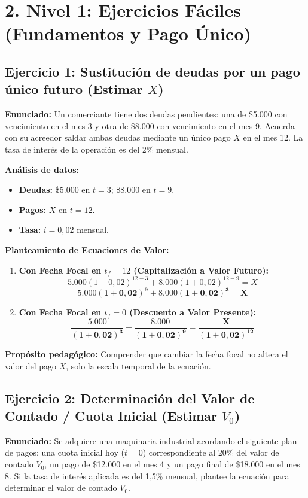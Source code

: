 \documentclass[11pt, a4paper]{article}
\begin{document}
\section*{\color{primary} 2. Nivel 1: Ejercicios Fáciles (Fundamentos y Pago Único)}

\subsection*{\color{secondary} Ejercicio 1: Sustitución de deudas por un pago único futuro (Estimar $X$)}
\textbf{Enunciado:} Un comerciante tiene dos deudas pendientes: una de \$5.000 con vencimiento en el mes 3 y otra de \$8.000 con vencimiento en el mes 9. Acuerda con su acreedor saldar ambas deudas mediante un único pago $X$ en el mes 12. La tasa de interés de la operación es del 2\% mensual.

\textbf{Análisis de datos:}
\begin{itemize}
    \item \textbf{Deudas:} \$5.000 en $t=3$; \$8.000 en $t=9$.
    \item \textbf{Pagos:} $X$ en $t=12$.
    \item \textbf{Tasa:} $i = 0,02$ mensual.
\end{itemize}

\textbf{Planteamiento de Ecuaciones de Valor:}
\begin{enumerate}[label=\alph*)]
    \item \textbf{Con Fecha Focal en $t_f = 12$ (Capitalización a Valor Futuro):}
    \[
    5.000(1 + 0,02)^{12-3} + 8.000(1 + 0,02)^{12-9} = X
    \]
    \[
    \mathbf{5.000(1 + 0,02)^9 + 8.000(1 + 0,02)^3 = X}
    \]

    \item \textbf{Con Fecha Focal en $t_f = 0$ (Descuento a Valor Presente):}
    \[
    \mathbf{\frac{5.000}{(1 + 0,02)^3} + \frac{8.000}{(1 + 0,02)^9} = \frac{X}{(1 + 0,02)^{12}}}
    \]
\end{enumerate}

\textbf{Propósito pedagógico:} Comprender que cambiar la fecha focal no altera el valor del pago $X$, solo la escala temporal de la ecuación.

\vspace{0.2cm}

\subsection*{\color{secondary} Ejercicio 2: Determinación del Valor de Contado / Cuota Inicial (Estimar $V_0$)}
\textbf{Enunciado:} Se adquiere una maquinaria industrial acordando el siguiente plan de pagos: una cuota inicial hoy ($t=0$) correspondiente al 20\% del valor de contado $V_0$, un pago de \$12.000 en el mes 4 y un pago final de \$18.000 en el mes 8. Si la tasa de interés aplicada es del 1,5\% mensual, plantee la ecuación para determinar el valor de contado $V_0$.
\end{document}
